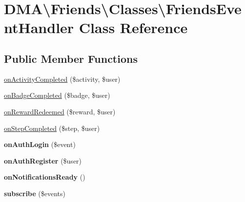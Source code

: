 \hypertarget{classDMA_1_1Friends_1_1Classes_1_1FriendsEventHandler}{\section{D\+M\+A\textbackslash{}Friends\textbackslash{}Classes\textbackslash{}Friends\+Event\+Handler Class Reference}
\label{classDMA_1_1Friends_1_1Classes_1_1FriendsEventHandler}
}
\subsection*{Public Member Functions}
\begin{DoxyCompactItemize}
\item 
\hyperlink{classDMA_1_1Friends_1_1Classes_1_1FriendsEventHandler_a6467365017b9d494122c8ded41a9a406}{on\+Activity\+Completed} (\$activity, \$user)
\item 
\hyperlink{classDMA_1_1Friends_1_1Classes_1_1FriendsEventHandler_aa13c2568369d06c2a0ca1c96f099ff09}{on\+Badge\+Completed} (\$badge, \$user)
\item 
\hyperlink{classDMA_1_1Friends_1_1Classes_1_1FriendsEventHandler_aeb8499a09334c87311a7f5840c43685a}{on\+Reward\+Redeemed} (\$reward, \$user)
\item 
\hyperlink{classDMA_1_1Friends_1_1Classes_1_1FriendsEventHandler_a3a99cae5eaa37efa395ef4fe8eb30c11}{on\+Step\+Completed} (\$step, \$user)
\item 
\hypertarget{classDMA_1_1Friends_1_1Classes_1_1FriendsEventHandler_a480d5807466962402ccc13260cfb0930}{{\bfseries on\+Auth\+Login} (\$event)}\label{classDMA_1_1Friends_1_1Classes_1_1FriendsEventHandler_a480d5807466962402ccc13260cfb0930}

\item 
\hypertarget{classDMA_1_1Friends_1_1Classes_1_1FriendsEventHandler_aa1d57544bd13c8acf91a3f4e3bf150a5}{{\bfseries on\+Auth\+Register} (\$user)}\label{classDMA_1_1Friends_1_1Classes_1_1FriendsEventHandler_aa1d57544bd13c8acf91a3f4e3bf150a5}

\item 
\hypertarget{classDMA_1_1Friends_1_1Classes_1_1FriendsEventHandler_ac411d3e487b4a16bd3116f3abf1e38a7}{{\bfseries on\+Notifications\+Ready} ()}\label{classDMA_1_1Friends_1_1Classes_1_1FriendsEventHandler_ac411d3e487b4a16bd3116f3abf1e38a7}

\item 
\hypertarget{classDMA_1_1Friends_1_1Classes_1_1FriendsEventHandler_a92cad97622be6dd1ed477dcc05d81074}{{\bfseries subscribe} (\$events)}\label{classDMA_1_1Friends_1_1Classes_1_1FriendsEventHandler_a92cad97622be6dd1ed477dcc05d81074}

\end{DoxyCompactItemize}


